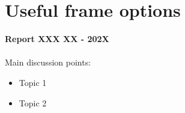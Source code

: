 \documentclass[8pt]{beamer}
\begin{document}
	
	
	\begin{frame}{}
		
	\end{frame}

	\begin{frame}
	\end{frame}
	\section*{Useful frame options}
	\label{}
	\justifying
	\begin{frame}
		\textbf{Report XXX XX - 202X}\\~\\
		Main discussion points:
		\begin{itemize}
			\item Topic 1
			\item Topic 2
		\end{itemize}
	\end{frame}
\end{document}
